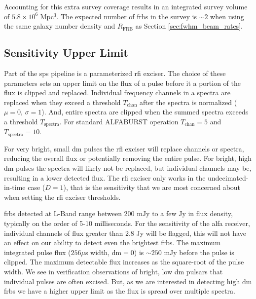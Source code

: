 \documentclass[a4paper,fleqn,usenatbib]{mnras}
\begin{document}
Accounting for this extra survey coverage results in an integrated survey volume
of $5.8 \times 10^6$ Mpc$^3$. The expected number of \glspl{frb} in the survey is
$\sim 2$ when using the same galaxy number density and $R_{\textrm{FRB}}$ as
Section \ref{sec:fwhm_beam_rates}.

\subsection{Sensitivity Upper Limit}
\label{sec:upper_limit}

Part of the \gls{sps} pipeline is a parameterized \gls{rfi} exciser. The choice
of these parameters sets an upper limit on the flux of a pulse before it a
portion of the flux is clipped and replaced. Individual frequency channels in a
spectra are replaced when they exceed a threshold $T_{\textrm{chan}}$ after the
spectra is normalized ($\mu=0$, $\sigma=1$). And, entire spectra are clipped
when the summed spectra exceeds a threshold $T_{\textrm{spectra}}$. For standard
ALFABURST operation $T_{\textrm{chan}} = 5$ and $T_{\textrm{spectra}} = 10$.

For very bright, small \gls{dm} pulses the \gls{rfi} exciser will replace
channels or spectra, reducing the overall flux or potentially removing the
entire pulse.  For bright, high \gls{dm} pulses the spectra will likely not be
replaced, but individual channels may be, resulting in a lower detected flux.
The \gls{rfi} exciser only works in the undecimated-in-time case ($D=1$), that
is the sensitivity that we are most concerned about when setting the \gls{rfi}
exciser thresholds.

\glspl{frb} detected at L-Band range between 200 mJy to a few Jy in flux
density, typically on the order of 5-10 milliseconds. For the sensitivity of the
\gls{alfa} receiver, individual channels of flux greater than 2.8 Jy will be
flagged, this will not have an effect on our ability to detect even the
brightest \glspl{frb}.  The maximum integrated pulse flux ($256 \mu$s width,
\gls{dm}$=0$) is $\sim250$ mJy before the pulse is clipped. The maximum
detectable flux increases as the square-root of the pulse width.  We see in
verification observations of bright, low \gls{dm} pulsars that individual
pulses are often excised. But, as we are interested in detecting high \gls{dm}
\glspl{frb} we have a higher upper limit as the flux is spread over multiple
spectra.
\end{document}
